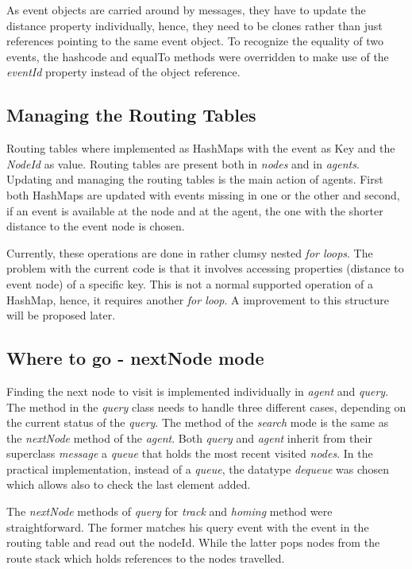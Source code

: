 \documentclass[a4paper,11pt,twoside]{article}
\begin{document}
As event objects are carried around by messages, they have to update
the distance property individually, hence, they need to be clones rather than
just references pointing to the same event object. To recognize the
equality of two events, the hashcode and equalTo methods were
overridden to make use of the \textit{eventId} property instead of the
object reference.

\subsection{Managing the Routing Tables}
Routing tables where implemented as HashMaps with the event as Key and
the \textit{NodeId} as value. Routing tables are present both in \textit{nodes}
and in \textit{agents}. Updating and managing the routing tables
is the main action of agents. First both HashMaps are updated with
events missing in one or the other and second, if an event is
available at the node and at the agent, the one with the shorter
distance to the event node is chosen.

Currently, these operations are done in rather clumsy nested
\textit{for loops}. The problem with the current code is that it involves
accessing properties (distance to event node) of a specific key. This
is not a normal supported operation of a HashMap, hence, it requires
another \textit{for loop}. A improvement to this structure will be
proposed later. 


\subsection{Where to go - nextNode mode}
Finding the next node to visit is implemented individually in 
\textit{agent} and \textit{query}. The method in the \textit{query}
class needs to handle three different cases, depending on the current
status of the \textit{query}. The method of the \textit{search} mode
is the same as the \textit{nextNode} method of the
\textit{agent}. Both \textit{query} and \textit{agent} inherit from 
their superclass \textit{message} a \textit{queue} that holds the most
recent visited \textit{nodes}. In the practical implementation,
instead of a \textit{queue}, the  datatype \textit{dequeue} was chosen
which allows also to check the last element added.

The \textit{nextNode} methods of \textit{query} for \textit{track} and
\textit{homing} method were straightforward. The former matches his
query event with the event in the routing table and read out the
nodeId. While the latter pops nodes from the route stack which holds
references to the nodes travelled. 
\end{document}
